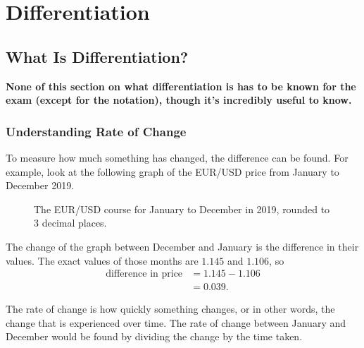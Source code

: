 \chapter{Differentiation}
\section{What Is Differentiation?}

\textbf{None of this section on what differentiation is has to be known for the exam (except for the notation), though it's incredibly useful to know.}

\subsection{Understanding Rate of Change}
To measure how much something has changed, the difference can be found. For example, look at the following graph of the EUR/USD price from January to December 2019.

\begin{figure}[h!]
	\centering
	\caption{The EUR/USD course for January to December in 2019, rounded to 3 decimal places.}
	\label{fig:EURUSD}
\end{figure}

The change of the graph between December and January is the difference in their values. The exact values of those months are $1.145$ and $1.106$, so
\begin{align*}
	\text{difference in price} &= 1.145 - 1.106\\
	&=0.039\text{.}
\end{align*}

The rate of change is how quickly something changes, or in other words, the change that is experienced over time. The rate of change between January and December would be found by dividing the change by the time taken.

